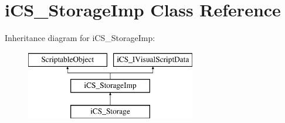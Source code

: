 \hypertarget{classi_c_s___storage_imp}{\section{i\+C\+S\+\_\+\+Storage\+Imp Class Reference}
\label{classi_c_s___storage_imp}
}
Inheritance diagram for i\+C\+S\+\_\+\+Storage\+Imp\+:\begin{figure}[H]
\begin{center}
\leavevmode
\includegraphics[height=3.000000cm]{classi_c_s___storage_imp}
\end{center}
\end{figure}
